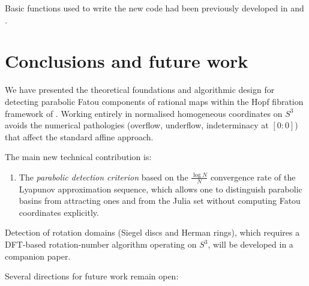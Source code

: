 \documentclass[12pt]{article}
\theoremstyle{definition}
\begin{document}
Basic functions used to write the new code had been previously developed
in \cite{Extremiana2019} and \cite{PBURF2019}.

\section{Conclusions and future work}
\label{sec:conclusions}

We have presented the theoretical foundations and algorithmic design for
detecting parabolic Fatou components of rational maps within the
Hopf fibration framework of \cite{Alvarez2023}.  Working entirely in
normalised homogeneous coordinates on $S^3$ avoids the numerical
pathologies (overflow, underflow, indeterminacy at $[0:0]$) that affect
the standard affine approach.

The main new technical contribution is:
\begin{enumerate}[label=(\arabic*)]
  \item The \emph{parabolic detection criterion} based on the
        $\tfrac{\log N}{N}$ convergence rate of the Lyapunov approximation
        sequence, which allows one to distinguish parabolic basins from
        attracting ones and from the Julia set without computing Fatou
        coordinates explicitly.
\end{enumerate}
Detection of rotation domains (Siegel discs and Herman rings), which requires
a DFT-based rotation-number algorithm operating on $S^3$, will be developed
in a companion paper.

Several directions for future work remain open:
\end{document}
